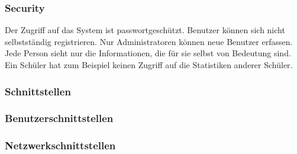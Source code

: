 \subsubsection*{Security}
Der Zugriff auf das System ist passwortgeschützt. Benutzer können sich nicht selbstständig registrieren. Nur Administratoren können neue Benutzer erfassen.
Jede Person sieht nur die Informationen, die für sie selbst von Bedeutung sind. Ein Schüler hat zum Beispiel keinen Zugriff auf die Statistiken anderer Schüler.

\newpage

\subsubsection{Schnittstellen}

\subsubsection*{Benutzerschnittstellen}

\subsubsection*{Netzwerkschnittstellen}


\newpage